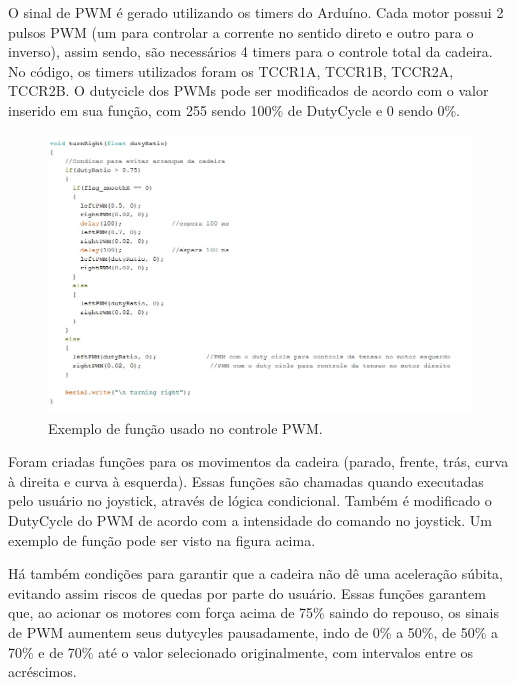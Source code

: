 O sinal de PWM é gerado utilizando os timers do Arduíno. Cada motor possui 2 pulsos PWM (um para controlar a corrente no sentido direto e outro para o inverso), assim sendo, são necessários 4 timers para o controle total da cadeira. No código, os timers utilizados foram os TCCR1A, TCCR1B, TCCR2A, TCCR2B. O dutycicle dos PWMs pode ser modificados de acordo com o valor inserido em sua função, com 255 sendo 100\% de DutyCycle e 0 sendo 0\%.

\begin{figure}[h!]
  \centering
  \includegraphics[width=1.0\textwidth]{figuras/Funcoes.jpg}
  \caption{Exemplo de função usado no controle PWM.}
\end{figure}

Foram criadas funções para os movimentos da cadeira (parado, frente, trás, curva à direita e curva à esquerda). Essas funções são chamadas quando executadas pelo usuário no joystick, através de lógica condicional. Também é modificado o DutyCycle do PWM de acordo com a intensidade do comando no joystick. Um exemplo de função pode ser visto na figura acima.

Há também condições para garantir que a cadeira não dê uma aceleração súbita, evitando assim riscos de quedas por parte do usuário. Essas funções garantem que, ao acionar os motores com força acima de 75\% saindo do repouso, os sinais de PWM aumentem seus dutycyles pausadamente, indo de 0\% a 50\%, de 50\% a 70\% e de 70\% até o valor selecionado originalmente, com intervalos entre os acréscimos.


